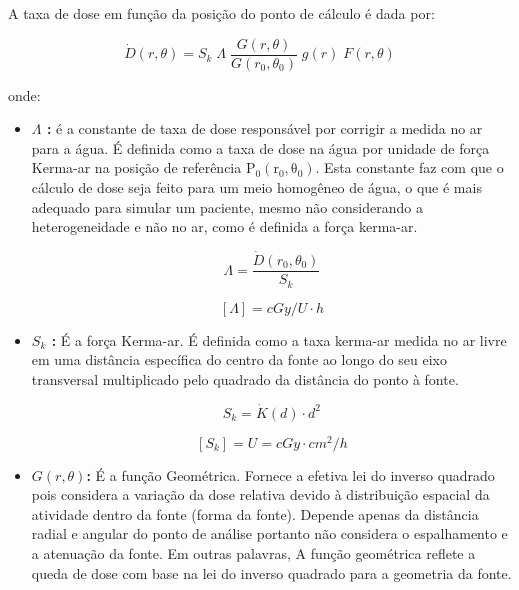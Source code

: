 \documentclass[11pt,a4paper]{article}
\begin{document}
			A taxa de dose em função da posição do ponto de cálculo é dada por:

			\begin{equation}
				\dot{D}(r, \theta) = S_k \; \varLambda \; \frac{G(r, \theta)}{G(r_0, \theta_0)} 
				\; g(r) \; F(r, \theta)
				\label{eq:formalismoTg43}
			\end{equation}

			onde:

			\begin{itemize}
				\item \textbf{\textcolor{CarnationPink}{$\varLambda$} : } é a constante de taxa de dose responsável por corrigir a medida no ar para a água. É definida como a taxa de dose na água por unidade de força Kerma-ar na posição de referência $\mathrm{P_0(r_0, \theta_0)}$. Esta constante faz com que o cálculo de dose seja feito para um meio homogêneo de água, o que é mais adequado para simular um paciente, mesmo não considerando a heterogeneidade e não no ar, como é definida a força kerma-ar.

					\begin{equation}
						\varLambda = \frac{\dot{D}(r_0, \theta_0)}{S_k}
					\end{equation}

					$$[\varLambda] = cGy / U \cdot h$$

				\item \textbf{\textcolor{CarnationPink}{$S_k$} : } É a força Kerma-ar. É definida como a taxa kerma-ar medida no ar livre em uma distância específica do centro da fonte ao longo do seu eixo transversal multiplicado pelo quadrado da distância do ponto à fonte.

					\begin{equation}
						S_k = \dot{K}(d) \cdot d^2
					\end{equation}

					$$[S_k] = U = cGy \cdot cm^2 / h$$

				\item \textbf{\textcolor{CarnationPink}{$G(r, \theta)$}: } É a função Geométrica. Fornece a efetiva lei do inverso quadrado pois considera a variação da dose relativa devido à distribuição espacial da atividade dentro da fonte (forma da fonte). Depende apenas da distância radial e angular do ponto de análise portanto não considera o espalhamento e a atenuação da fonte. Em outras palavras, A função geométrica reflete a queda de dose com base na lei do inverso quadrado para a geometria da fonte.
				

\end{itemize}
\end{document}
